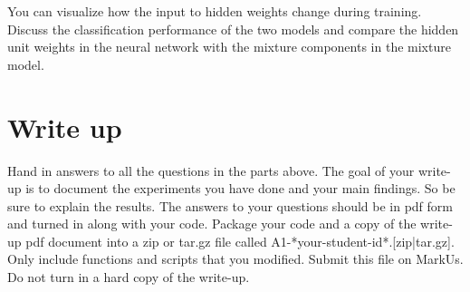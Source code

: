 \documentclass[12pt]{article}
\begin{document}
You can visualize how the input to hidden weights change during training.
Discuss the classification performance of the two models and compare the hidden
unit weights in the neural network with the mixture components in the mixture
model.





\section{Write up}

Hand in answers to all the questions in the parts above. The goal of your write-up is to document
the experiments you have done and your main findings. So be sure to explain the results.
The answers to your questions should be in pdf form and turned in along with your code. Package
your code and a copy of the write-up pdf document into a zip or tar.gz file called
A1-*your-student-id*.[zip|tar.gz]. Only include functions and scripts that you 
modified. Submit this file on MarkUs. Do not turn in a hard copy of the write-up.



\end{document}
